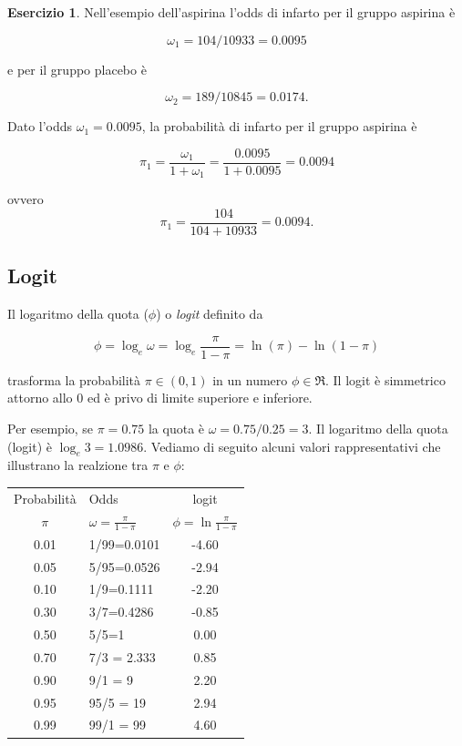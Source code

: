 \documentclass[
  11pt,
]{krantz}
\theoremstyle{definition}
\theoremstyle{definition}
\theoremstyle{definition}
\newtheorem{exercise}{Esercizio}[chapter]
\theoremstyle{definition}
\theoremstyle{remark}
\begin{document}
\begin{exercise}
Nell'esempio dell'aspirina l'odds di infarto per il gruppo aspirina è

\[
\omega_1 = 104/10933 = 0.0095
\]

e per il gruppo placebo è

\[
\omega_2 = 189/10845 = 0.0174.
\]

Dato l'odds \(\omega_1 = 0.0095\), la probabilità di infarto per il gruppo aspirina è

\[
\pi_1 =\frac{\omega_1}{1 + \omega_1} = \frac{0.0095}{1 + 0.0095}= 0.0094
\]

ovvero \[\pi_1 = \frac{104}{104+10933}= 0.0094.\]
\end{exercise}

\hypertarget{logit}{%
\subsection{Logit}\label{logit}}

Il logaritmo della quota (\(\phi\)) o \emph{logit} definito da

\[
\phi = \log_e \omega = \log_e \frac{\pi}{1 - \pi} = \ln (\pi) - \ln (1-\pi)
\]

trasforma la probabilità \(\pi \in (0, 1)\) in un numero \(\phi \in \Re\). Il logit è simmetrico attorno allo 0 ed è privo di limite superiore e inferiore.

Per esempio, se \(\pi = 0.75\) la quota è \(\omega = 0.75/0.25 = 3\). Il logaritmo della quota (logit) è \(\log_e 3 = 1.0986.\) Vediamo di seguito alcuni valori rappresentativi che illustrano la realzione tra \(\pi\) e \(\phi\):

\begin{longtable}[]{@{}clc@{}}
\toprule
\endhead
Probabilità & Odds & logit \\
\(\pi\) & \(\omega= \frac{\pi}{1-\pi}\) & \(\phi = \ln \frac{\pi}{1-\pi}\) \\
0.01 & 1/99=0.0101 & -4.60 \\
0.05 & 5/95=0.0526 & -2.94 \\
0.10 & 1/9=0.1111 & -2.20 \\
0.30 & 3/7=0.4286 & -0.85 \\
0.50 & 5/5=1 & 0.00 \\
0.70 & 7/3 = 2.333 & 0.85 \\
0.90 & 9/1 = 9 & 2.20 \\
0.95 & 95/5 = 19 & 2.94 \\
0.99 & 99/1 = 99 & 4.60 \\
\bottomrule
\end{longtable}
\end{document}
